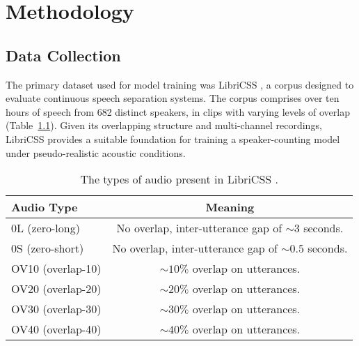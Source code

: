 
\chapter{Methodology}

\section{Data Collection}
\label{sec:data_col}
The primary dataset used for model training was LibriCSS \cite{libricss}, a corpus designed to evaluate continuous speech separation systems. The corpus comprises over ten hours of speech from 682 distinct speakers, in clips with varying levels of overlap (Table~\ref{tab:LibriCSS}). Given its overlapping structure and multi-channel recordings, LibriCSS provides a suitable foundation for training a speaker-counting model under pseudo-realistic acoustic conditions.

\begin{table}[H]
  \centering
  \caption{The types of audio present in LibriCSS \cite{libricss}.}
  \label{tab:LibriCSS}
  \begin{tabular}{|l|c|}
    \hline
    \textbf{Audio Type} & \textbf{Meaning} \\
    \hline
    0L (zero-long) & No overlap, inter-utterance gap of $\sim3$ seconds. \\
    \hline
    0S (zero-short) & No overlap, inter-utterance gap of $\sim0.5$ seconds. \\
    \hline
    OV10 (overlap-10) & $\sim10\%$ overlap on utterances. \\
    \hline
    OV20 (overlap-20) & $\sim20\%$ overlap on utterances. \\
    \hline
    OV30 (overlap-30) & $\sim30\%$ overlap on utterances. \\
    \hline
    OV40 (overlap-40) & $\sim40\%$ overlap on utterances. \\
    \hline
  \end{tabular}
\end{table}

